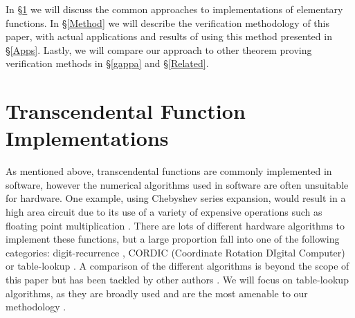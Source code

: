 \documentclass{fac}
\begin{document}
In \S \ref{trans functs} we will discuss the common approaches to implementations of elementary functions. In \S \ref{Method} we will describe the verification methodology of this paper, with actual applications and results of using this method presented in \S \ref{Apps}. Lastly, we will compare our approach to other theorem proving verification methods in \S \ref{gappa} and \S \ref{Related}.


\section{Transcendental Function Implementations}
\label{trans functs}

As mentioned above, transcendental functions are commonly implemented in software, however the numerical algorithms used in software are often unsuitable for hardware. One example, using Chebyshev series expansion, would result in a high area circuit due to its use of a variety of expensive operations such as floating point multiplication \cite{fowkes1993hardware}. There are lots of different hardware algorithms to implement these functions, but a large proportion fall into one of the following categories: digit-recurrence \cite{bajard1994bkm,1030708}, CORDIC  (Coordinate Rotation DIgital Computer) \cite{volder1959cordic,andraka1998survey,10.1145/1478786.1478840} or table-lookup \cite{tang1991table,story1999new}. A comparison of the different algorithms is beyond the scope of this paper but has been tackled by other authors \cite{tang1991table,pineiro2004algorithm}. We will focus on table-lookup algorithms, as they are broadly used and are the most amenable to our methodology .
\end{document}
